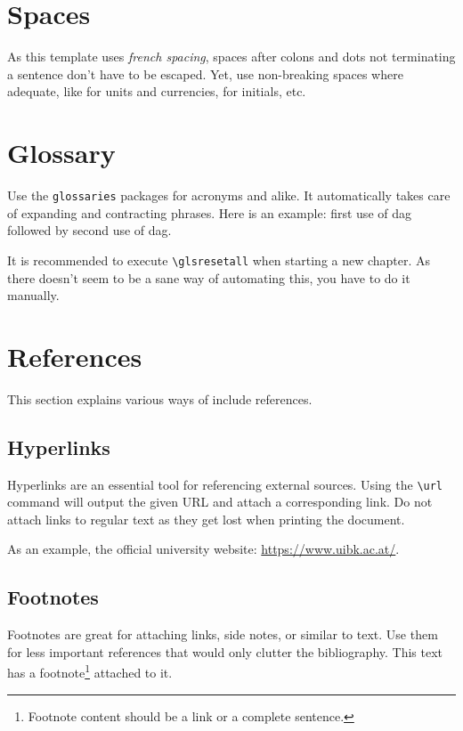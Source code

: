 \section{Spaces}

As this template uses \emph{french spacing}, spaces after colons and dots not terminating a sentence don't have to be escaped.
Yet, use non-breaking spaces where adequate, like for units and currencies, for initials, etc.

\section{Glossary}

Use the \texttt{glossaries} packages for acronyms and alike.
It automatically takes care of expanding and contracting phrases.
Here is an example: first use of \gls{dag} followed by second use of \gls{dag}.

It is recommended to execute \texttt{\textbackslash{}glsresetall} when starting a new chapter.
As there doesn't seem to be a sane way of automating this, you have to do it manually.

\section{References}

This section explains various ways of include references.

\subsection{Hyperlinks}

Hyperlinks are an essential tool for referencing external sources.
Using the \texttt{\textbackslash{}url} command will output the given URL and attach a corresponding link.
Do not attach links to regular text as they get lost when printing the document.

As an example, the official university website: \url{https://www.uibk.ac.at/}.

\subsection{Footnotes}

Footnotes are great for attaching links, side notes, or similar to text.
Use them for less important references that would only clutter the bibliography.
This text has a footnote\footnote{Footnote content should be a link or a complete sentence.} attached to it.


